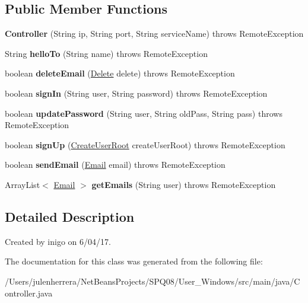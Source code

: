 \subsection*{Public Member Functions}
\begin{DoxyCompactItemize}
\item 
\mbox{\label{class_controller_a1479bbe8b34050fcc9c31f47fa29b71a}} 
{\bfseries Controller} (String ip, String port, String service\+Name)  throws Remote\+Exception 
\item 
\mbox{\label{class_controller_a32989980c784fc933af56f981d208ca1}} 
String {\bfseries hello\+To} (String name)  throws Remote\+Exception 
\item 
\mbox{\label{class_controller_ab681529b51d028c04978b1856f481809}} 
boolean {\bfseries delete\+Email} (\hyperlink{class_delete}{Delete} delete)  throws Remote\+Exception
\item 
\mbox{\label{class_controller_a8de8d716dde3d96111ef13686c91b10f}} 
boolean {\bfseries sign\+In} (String user, String password)  throws Remote\+Exception 
\item 
\mbox{\label{class_controller_a45750f5a0867b3a9512681f6e4ddeff9}} 
boolean {\bfseries update\+Password} (String user, String old\+Pass, String pass)  throws Remote\+Exception 
\item 
\mbox{\label{class_controller_aa4680640bce9264c99dd4cc928d31384}} 
boolean {\bfseries sign\+Up} (\hyperlink{class_create_user_root}{Create\+User\+Root} create\+User\+Root)  throws Remote\+Exception 
\item 
\mbox{\label{class_controller_a5f9217d932e5189ac91b54bde4136964}} 
boolean {\bfseries send\+Email} (\hyperlink{class_email}{Email} email)  throws Remote\+Exception 
\item 
\mbox{\label{class_controller_ab019b3e68c16d6be3c3e9a33ca11ba8f}} 
Array\+List$<$ \hyperlink{class_email}{Email} $>$ {\bfseries get\+Emails} (String user)  throws Remote\+Exception 
\end{DoxyCompactItemize}


\subsection{Detailed Description}
Created by inigo on 6/04/17. 

The documentation for this class was generated from the following file\+:\begin{DoxyCompactItemize}
\item 
/\+Users/julenherrera/\+Net\+Beans\+Projects/\+S\+P\+Q08/\+User\+\_\+\+Windows/src/main/java/Controller.\+java\end{DoxyCompactItemize}
